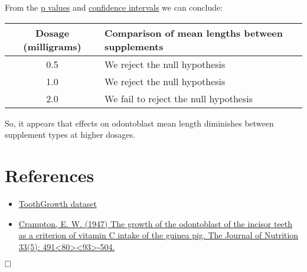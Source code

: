 \documentclass[legalpaper]{article}
\begin{document}
From the \href{https://en.wikipedia.org/wiki/P-value}{p values} and
\href{https://en.wikipedia.org/wiki/Confidence_interval}{confidence
intervals} we can conclude:

\begin{longtable}[c]{@{}cl@{}}
\toprule
Dosage (milligrams) & Comparison of mean lengths between
supplements\tabularnewline
\midrule
\endhead
0.5 & We reject the null hypothesis\tabularnewline
1.0 & We reject the null hypothesis\tabularnewline
2.0 & We fail to reject the null hypothesis\tabularnewline
\bottomrule
\end{longtable}

So, it appears that effects on odontoblast mean length diminishes
between supplement types at higher dosages.

\section{References}\label{references}

\begin{itemize}
\itemsep1pt\parskip0pt
\item
  \href{https://stat.ethz.ch/R-manual/R-devel/library/datasets/html/ToothGrowth.html}{ToothGrowth
  dataset}
\item
  \href{http://jn.nutrition.org/content/33/5/491.full.pdf}{Crampton, E.
  W. (1947) The growth of the odontoblast of the incisor teeth as a
  criterion of vitamin C intake of the guinea pig. The Journal of
  Nutrition 33(5):
  491\textless{}80\textgreater{}\textless{}93\textgreater{}-504.}
\end{itemize}

\(\hfill \square\)
\end{document}
